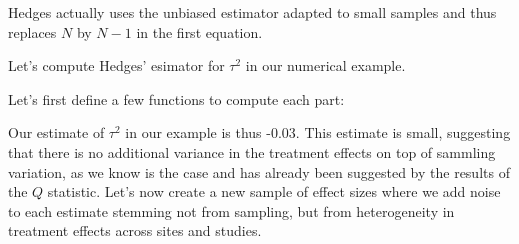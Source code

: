 \documentclass[]{book}
\newenvironment{Shaded}{\begin{snugshade}}{\end{snugshade}}
\newcommand{\KeywordTok}[1]{\textcolor[rgb]{0.13,0.29,0.53}{\textbf{#1}}}
\newcommand{\DataTypeTok}[1]{\textcolor[rgb]{0.13,0.29,0.53}{#1}}
\newcommand{\DecValTok}[1]{\textcolor[rgb]{0.00,0.00,0.81}{#1}}
\newcommand{\FloatTok}[1]{\textcolor[rgb]{0.00,0.00,0.81}{#1}}
\newcommand{\StringTok}[1]{\textcolor[rgb]{0.31,0.60,0.02}{#1}}
\newcommand{\ControlFlowTok}[1]{\textcolor[rgb]{0.13,0.29,0.53}{\textbf{#1}}}
\newcommand{\OperatorTok}[1]{\textcolor[rgb]{0.81,0.36,0.00}{\textbf{#1}}}
\newcommand{\NormalTok}[1]{#1}
\theoremstyle{definition}
\theoremstyle{definition}
\theoremstyle{definition}
\theoremstyle{remark}
\let\BeginKnitrBlock\begin \let\EndKnitrBlock\end
\begin{document}
\BeginKnitrBlock{remark}
\iffalse{} {Remark. } \fi{}Hedges actually uses the unbiased estimator
adapted to small samples and thus replaces \(N\) by \(N-1\) in the first
equation.
\EndKnitrBlock{remark}

\BeginKnitrBlock{example}
\protect\hypertarget{exm:unnamed-chunk-152}{}{\label{exm:unnamed-chunk-152}
}Let's compute Hedges' esimator for \(\tau^2\) in our numerical example.
\EndKnitrBlock{example}

Let's first define a few functions to compute each part:

\begin{Shaded}
\end{Shaded}

Our estimate of \(\tau^2\) in our example is thus -0.03. This estimate
is small, suggesting that there is no additional variance in the
treatment effects on top of sammling variation, as we know is the case
and has already been suggested by the results of the \(Q\) statistic.
Let's now create a new sample of effect sizes where we add noise to each
estimate stemming not from sampling, but from heterogeneity in treatment
effects across sites and studies.

\begin{Shaded}
\end{Shaded}
\end{document}
